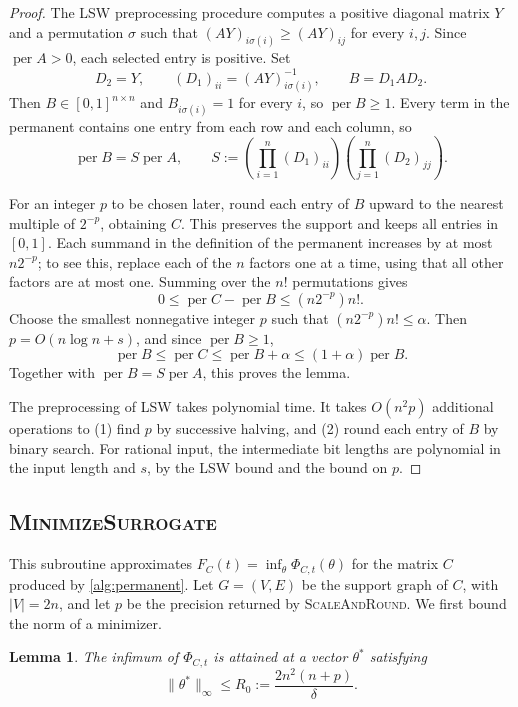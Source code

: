 \documentclass[11pt,reqno,letterpaper]{amsart}
\numberwithin{equation}{section}
\newtheorem{lemma}[lemma]{Lemma}
\theoremstyle{definition}
\theoremstyle{remark}
\newcommand{\norm}[1]{\lVert #1\rVert}
\DeclareMathOperator{\per}{per}
\begin{document}
\begin{proof}
The LSW preprocessing procedure
\cite[Section~3.1 and Theorem~3.1]{LSW}
computes a positive diagonal matrix $Y$ and a permutation $\sigma$
such that $(AY)_{i\sigma(i)}\ge(AY)_{ij}$ for every $i,j$.
Since $\per A>0$, each selected entry is positive. Set
\[
 D_2=Y,\qquad (D_1)_{ii}=(AY)_{i\sigma(i)}^{-1},\qquad B=D_1AD_2.
\]
Then $B\in[0,1]^{n\times n}$ and $B_{i\sigma(i)}=1$ for every $i$,
so $\per B\ge1$.
Every term in the permanent contains one entry from each row
and each column, so
\[
 \per B=S\per A,
 \qquad
 S:=\left(\prod_{i=1}^n(D_1)_{ii}\right)
    \left(\prod_{j=1}^n(D_2)_{jj}\right).
\]

For an integer $p$ to be chosen later, round each entry of $B$ upward
to the nearest multiple of $2^{-p}$, obtaining $C$.
This preserves the support and keeps all entries in $[0,1]$.
Each summand in the definition of the permanent increases by at most $n2^{-p}$; to see this, replace each of the $n$ factors one at a time, using that all other factors
are at most one. Summing over the $n!$ permutations gives
\[
 0\le\per C-\per B\le (n 2^{-p}) n!.
\]
Choose the smallest nonnegative integer $p$ such that
$(n 2^{-p})n!\le\alpha$.
Then $p=O(n\log n+s)$, and since $\per B\ge1$,
\[
 \per B\le\per C\le\per B+\alpha
 \le(1+\alpha)\per B.
\]
Together with $\per B=S\per A$, this proves the lemma.

The preprocessing of LSW takes polynomial time.
It takes $O(n^2p)$ additional operations to (1) find $p$ by successive halving, and (2) round each entry of $B$ by binary
search.
For rational input, the intermediate bit lengths are polynomial
in the input length and $s$, by the LSW bound
\cite[proof of Theorem~3.4]{LSW} and the bound on $p$.
\end{proof}

\subsection{\textsc{MinimizeSurrogate}}
\label{sec:surrogate-minimization}

This subroutine approximates
$F_C(t)=\inf_\theta\Phi_{C,t}(\theta)$ for the matrix $C$
produced by \cref{alg:permanent}. Let $G=(V,E)$ be the support graph
of $C$, with $|V|=2n$, and let $p$ be the precision returned by
\textsc{ScaleAndRound}. We first bound the norm of a minimizer.

\begin{lemma}\label{lem:field-bound}
The infimum of $\Phi_{C,t}$ is attained at a vector $\theta^*$
satisfying
\begin{equation}\label{eq:field-radius}
 \norm{\theta^*}_\infty\le R_0:=\frac{2n^2(n+p)}{\delta}.
\end{equation}
\end{lemma}
\end{document}
